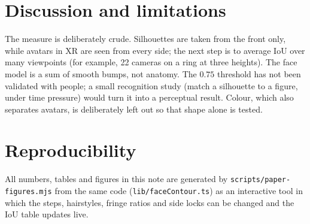 \documentclass[11pt]{article}
\begin{document}
\section{Discussion and limitations}
The measure is deliberately crude.
Silhouettes are taken from the front only, while avatars in XR are seen from every side; the next step is to average IoU over many viewpoints (for example, 22 cameras on a ring at three heights).
The face model is a sum of smooth bumps, not anatomy.
The $0.75$ threshold has not been validated with people; a small recognition study (match a silhouette to a figure, under time pressure) would turn it into a perceptual result.
Colour, which also separates avatars, is deliberately left out so that shape alone is tested.

\section{Reproducibility}
All numbers, tables and figures in this note are generated by \texttt{scripts/paper-figures.mjs} from the same code (\texttt{lib/faceContour.ts}) as an interactive tool in which the steps, hairstyles, fringe ratios and side locks can be changed and the IoU table updates live.



\end{document}
